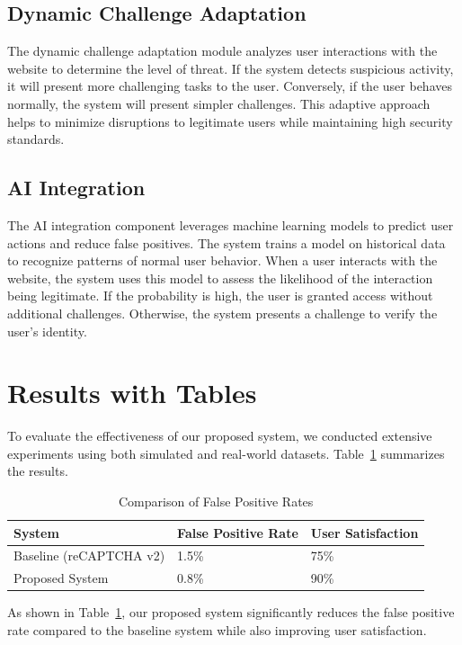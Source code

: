 \documentclass{article}
\begin{document}
\subsection{Dynamic Challenge Adaptation}
The dynamic challenge adaptation module analyzes user interactions with the website to determine the level of threat. If the system detects suspicious activity, it will present more challenging tasks to the user. Conversely, if the user behaves normally, the system will present simpler challenges. This adaptive approach helps to minimize disruptions to legitimate users while maintaining high security standards.

\subsection{AI Integration}
The AI integration component leverages machine learning models to predict user actions and reduce false positives. The system trains a model on historical data to recognize patterns of normal user behavior. When a user interacts with the website, the system uses this model to assess the likelihood of the interaction being legitimate. If the probability is high, the user is granted access without additional challenges. Otherwise, the system presents a challenge to verify the user's identity.

\section{Results with Tables}
To evaluate the effectiveness of our proposed system, we conducted extensive experiments using both simulated and real-world datasets. Table~\ref{table:results} summarizes the results.

\begin{table}[ht]
\centering
\caption{Comparison of False Positive Rates}
\label{table:results}
\begin{tabularx}{\textwidth}{@{} X X X @{}}
\toprule
\textbf{System} & \textbf{False Positive Rate} & \textbf{User Satisfaction} \\
\midrule
Baseline (reCAPTCHA v2) & 1.5\% & 75\% \\
Proposed System & 0.8\% & 90\% \\
\bottomrule
\end{tabularx}
\end{table}

As shown in Table~\ref{table:results}, our proposed system significantly reduces the false positive rate compared to the baseline system while also improving user satisfaction.
\end{document}
